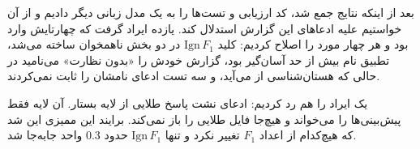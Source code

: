 بعد از اینکه نتایج جمع شد، کد ارزیابی و تست‌ها را به یک مدل زبانی دیگر دادیم و از آن خواستیم علیه ادعاهای این گزارش استدلال کند. یازده ایراد گرفت که چهارتایش وارد بود و هر چهار مورد را اصلاح کردیم: کلید $\mathrm{Ign}\,F_1$ در دو بخش ناهمخوان ساخته می‌شد، تطبیق نام بیش از حد آسان‌گیر بود، گزارش خودش را «بدون نظارت» می‌نامید در حالی که هستان‌شناسی از  می‌آید، و سه تست ادعای نامشان را ثابت نمی‌کردند.

یک ایراد را هم رد کردیم: ادعای نشت پاسخ طلایی از لایه بستار. آن لایه فقط پیش‌بینی‌ها را می‌خواند و هیچ‌جا فایل طلایی را باز نمی‌کند. برایند این ممیزی این شد که هیچ‌کدام از اعداد $F_1$ تغییر نکرد و تنها $\mathrm{Ign}\,F_1$ حدود $0.3$ واحد جابه‌جا شد.
